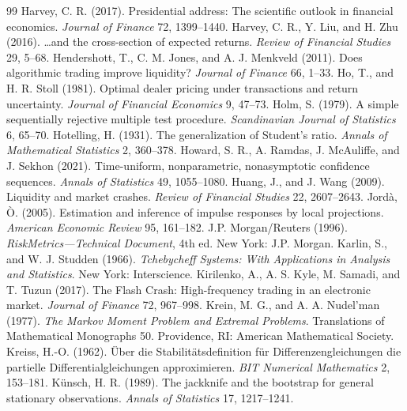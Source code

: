 \begin{thebibliography}{99}
 Harvey, C. R. (2017). Presidential address: The scientific outlook in financial economics. \emph{Journal of Finance} 72, 1399--1440.
 Harvey, C. R., Y. Liu, and H. Zhu (2016). \ldots and the cross-section of expected returns. \emph{Review of Financial Studies} 29, 5--68.
 Hendershott, T., C. M. Jones, and A. J. Menkveld (2011). Does algorithmic trading improve liquidity? \emph{Journal of Finance} 66, 1--33.
 Ho, T., and H. R. Stoll (1981). Optimal dealer pricing under transactions and return uncertainty. \emph{Journal of Financial Economics} 9, 47--73.
 Holm, S. (1979). A simple sequentially rejective multiple test procedure. \emph{Scandinavian Journal of Statistics} 6, 65--70.
 Hotelling, H. (1931). The generalization of Student's ratio. \emph{Annals of Mathematical Statistics} 2, 360--378.
 Howard, S. R., A. Ramdas, J. McAuliffe, and J. Sekhon (2021). Time-uniform, nonparametric, nonasymptotic confidence sequences. \emph{Annals of Statistics} 49, 1055--1080.
 Huang, J., and J. Wang (2009). Liquidity and market crashes. \emph{Review of Financial Studies} 22, 2607--2643.
 Jord\`a, \`O. (2005). Estimation and inference of impulse responses by local projections. \emph{American Economic Review} 95, 161--182.
 J.P. Morgan/Reuters (1996). \emph{RiskMetrics---Technical Document}, 4th ed. New York: J.P. Morgan.
 Karlin, S., and W. J. Studden (1966). \emph{Tchebycheff Systems: With Applications in Analysis and Statistics}. New York: Interscience.
 Kirilenko, A., A. S. Kyle, M. Samadi, and T. Tuzun (2017). The Flash Crash: High-frequency trading in an electronic market. \emph{Journal of Finance} 72, 967--998.
 Krein, M. G., and A. A. Nudel'man (1977). \emph{The Markov Moment Problem and Extremal Problems}. Translations of Mathematical Monographs 50. Providence, RI: American Mathematical Society.
 Kreiss, H.-O. (1962). \"Uber die Stabilit\"atsdefinition f\"ur Differenzengleichungen die partielle Differentialgleichungen approximieren. \emph{BIT Numerical Mathematics} 2, 153--181.
 K\"unsch, H. R. (1989). The jackknife and the bootstrap for general stationary observations. \emph{Annals of Statistics} 17, 1217--1241.

\end{thebibliography}
